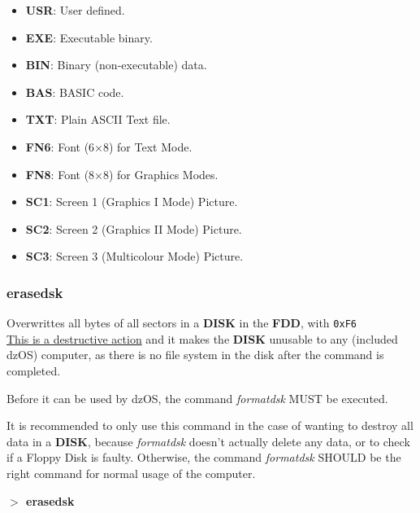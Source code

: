 \documentclass[a4paper,11pt]{article}
\begin{document}
        \begin{itemize}
            \item \textbf{USR}: User defined.
            \item \textbf{EXE}: Executable binary.
            \item \textbf{BIN}: Binary (non-executable) data.
            \item \textbf{BAS}: BASIC code.
            \item \textbf{TXT}: Plain ASCII Text file.
            \item \textbf{FN6}: Font (6×8) for Text Mode.
            \item \textbf{FN8}: Font (8×8) for Graphics Modes.
            \item \textbf{SC1}: Screen 1 (Graphics I Mode) Picture.
            \item \textbf{SC2}: Screen 2 (Graphics II Mode) Picture.
            \item \textbf{SC3}: Screen 3 (Multicolour Mode) Picture.
        \end{itemize}

        \subsubsection{{\color{blue}erasedsk}}
        Overwrittes all bytes of all sectors in a \textbf{DISK} in the
        \textbf{FDD}, with \texttt{0xF6} \\

        \underline{This is a destructive action} and it makes the \textbf{DISK}
        unusable to any (included dzOS) computer, as there is no file system in
        the disk after the command is completed.
        
        Before it can be used by dzOS, the command \textit{formatdsk} MUST be
        executed.

        It is recommended to only use this command in the case of wanting to
        destroy all data in a \textbf{DISK}, because \textit{formatdsk} doesn't
        actually delete any data, or to check if a Floppy Disk is faulty.
        Otherwise, the command \textit{formatdsk} SHOULD be the right command
        for normal usage of the computer.

        \hspace{1.9cm}\textbf{$>$ erasedsk}
\end{document}
